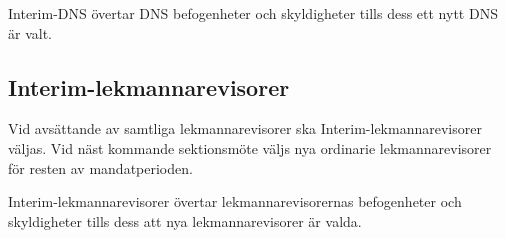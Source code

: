 Interim-DNS övertar DNS befogenheter och skyldigheter tills dess ett nytt DNS är valt.
\subsection{Interim-lekmannarevisorer}
Vid avsättande av samtliga lekmannarevisorer ska Interim-lekmannarevisorer väljas.
Vid näst kommande sektionsmöte väljs nya ordinarie lekmannarevisorer för resten av mandatperioden.

Interim-lekmannarevisorer övertar lekmannarevisorernas befogenheter och skyldigheter tills dess att nya lekmannarevisorer är valda.
